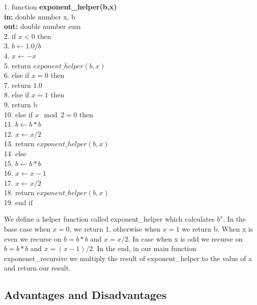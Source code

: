 \documentclass[a4paper, 11pt]{article}
\begin{document}
\begin{algorithm}

\begin{algorithmic} 
1. function \textbf{exponent\_helper(b,x)}\\
\textbf{in: } double number x, b\\
\textbf{out: } double number sum\\
2. if  \STATE $x < 0$  then\\
3. \qquad $b \leftarrow 1.0 / b$ \\
4. \qquad $x \leftarrow -x$ \\
5. \qquad return $exponent\_helper(b, x)$ \\
6. else if \STATE $x = 0$ then \\
7.    \qquad return $1.0$ \\
8. else if \STATE $x = 1$ then \\
9.    \qquad return b \\
10. else if \STATE $x \mod  2 = 0$ then \\
11.    \qquad $b \leftarrow b * b$ \\
12.    \qquad $x \leftarrow x / 2$ \\
13.    \qquad return $exponent\_helper(b, x)$\\
14. else \\
15.    \qquad $b \leftarrow b * b$ \\
16.    \qquad $x \leftarrow x - 1$ \\
17.    \qquad $x \leftarrow x / 2$ \\
18.    \qquad return $exponent\_helper(b, x)$\\
19. end if \\
\end{algorithmic}

\end{algorithm}
We define a helper function called exponent\_helper which calculates $b^x$. In the base case when $x = 0$, we return 1, otherwise when $x = 1$ we return b. When x is even we recurse on $b = b* b$ and $x = x /2$. In case when x is odd we recurse on $ b = b* b$ and $x = (x-1)/ 2$. In the end, in our main function exponenet\_recursive we multiply the result of exponent\_helper to the value of a and return our result.

\newpage

\subsection*{Advantages and Disadvantages}
\end{document}
